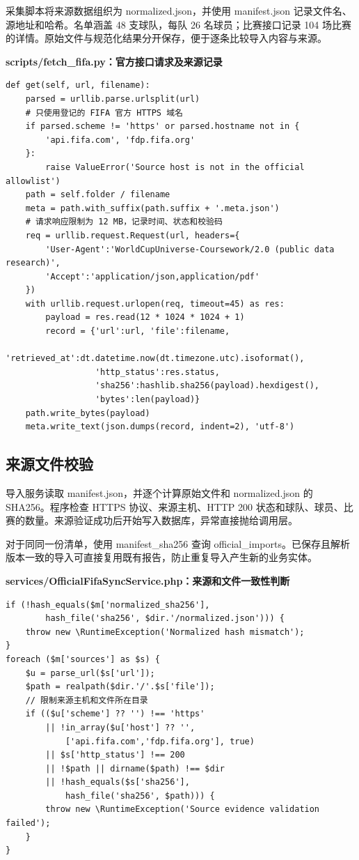 \documentclass[UTF8,a4paper,11pt]{ctexart}
\begin{document}
采集脚本将来源数据组织为 normalized.json，并使用 manifest.json 记录文件名、源地址和哈希。名单涵盖 48 支球队，每队 26 名球员；比赛接口记录 104 场比赛的详情。原始文件与规范化结果分开保存，便于逐条比较导入内容与来源。


\noindent\textbf{scripts/fetch\_fifa.py：官方接口请求及来源记录}\par\vspace{2pt}
\begin{lstlisting}
def get(self, url, filename):
    parsed = urllib.parse.urlsplit(url)
    # 只使用登记的 FIFA 官方 HTTPS 域名
    if parsed.scheme != 'https' or parsed.hostname not in {
        'api.fifa.com', 'fdp.fifa.org'
    }:
        raise ValueError('Source host is not in the official allowlist')
    path = self.folder / filename
    meta = path.with_suffix(path.suffix + '.meta.json')
    # 请求响应限制为 12 MB，记录时间、状态和校验码
    req = urllib.request.Request(url, headers={
        'User-Agent':'WorldCupUniverse-Coursework/2.0 (public data research)',
        'Accept':'application/json,application/pdf'
    })
    with urllib.request.urlopen(req, timeout=45) as res:
        payload = res.read(12 * 1024 * 1024 + 1)
        record = {'url':url, 'file':filename,
                  'retrieved_at':dt.datetime.now(dt.timezone.utc).isoformat(),
                  'http_status':res.status,
                  'sha256':hashlib.sha256(payload).hexdigest(),
                  'bytes':len(payload)}
    path.write_bytes(payload)
    meta.write_text(json.dumps(record, indent=2), 'utf-8')
\end{lstlisting}

\subsection{来源文件校验}
导入服务读取 manifest.json，并逐个计算原始文件和 normalized.json 的 SHA256。程序检查 HTTPS 协议、来源主机、HTTP 200 状态和球队、球员、比赛的数量。来源验证成功后开始写入数据库，异常直接抛给调用层。

对于同同一份清单，使用 manifest\_sha256 查询 official\_imports。已保存且解析版本一致的导入可直接复用既有报告，防止重复导入产生新的业务实体。

\noindent\textbf{services/OfficialFifaSyncService.php：来源和文件一致性判断}\par\vspace{2pt}
\begin{lstlisting}
if (!hash_equals($m['normalized_sha256'],
        hash_file('sha256', $dir.'/normalized.json'))) {
    throw new \RuntimeException('Normalized hash mismatch');
}
foreach ($m['sources'] as $s) {
    $u = parse_url($s['url']);
    $path = realpath($dir.'/'.$s['file']);
    // 限制来源主机和文件所在目录
    if (($u['scheme'] ?? '') !== 'https'
        || !in_array($u['host'] ?? '',
            ['api.fifa.com','fdp.fifa.org'], true)
        || $s['http_status'] !== 200
        || !$path || dirname($path) !== $dir
        || !hash_equals($s['sha256'],
            hash_file('sha256', $path))) {
        throw new \RuntimeException('Source evidence validation failed');
    }
}
\end{lstlisting}
\end{document}
